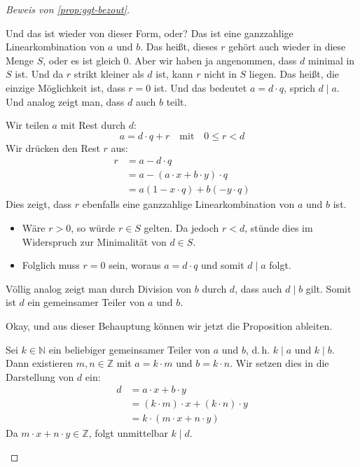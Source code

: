 \begin{proof}[Beweis von \cref{prop:ggt-bezout}]
\begin{spoken-clean}[00:18:28 - 00:22:20]
Und das ist wieder von dieser Form, oder? Das ist eine ganzzahlige Linearkombination von $a$ und $b$. Das heißt, dieses $r$ gehört auch wieder in diese Menge $S$, oder es ist gleich $0$. Aber wir haben ja angenommen, dass $d$ minimal in $S$ ist. Und da $r$ strikt kleiner als $d$ ist, kann $r$ nicht in $S$ liegen. Das heißt, die einzige Möglichkeit ist, dass $r = 0$ ist. Und das bedeutet $a = d \cdot q$, sprich $d \mid a$. Und analog zeigt man, dass $d$ auch $b$ teilt.
\end{spoken-clean}

\begin{math-stroke}
Wir teilen $a$ mit Rest durch $d$:
\[ a = d \cdot q + r \quad \text{mit} \quad 0 \le r < d \]
Wir drücken den Rest $r$ aus:
\begin{align*}
r &= a - d \cdot q \\
&= a - (a \cdot x + b \cdot y) \cdot q \\
&= a(1 - x \cdot q) + b(-y \cdot q)
\end{align*}
Dies zeigt, dass $r$ ebenfalls eine ganzzahlige Linearkombination von $a$ und $b$ ist.
\begin{itemize}
    \item Wäre $r > 0$, so würde $r \in S$ gelten. Da jedoch $r < d$, stünde dies im Widerspruch zur Minimalität von $d \in S$.
    \item Folglich muss $r = 0$ sein, woraus $a = d \cdot q$ und somit $d \mid a$ folgt.
\end{itemize}
Völlig analog zeigt man durch Division von $b$ durch $d$, dass auch $d \mid b$ gilt. Somit ist $d$ ein gemeinsamer Teiler von $a$ und $b$.
\end{math-stroke}

\begin{spoken-clean}[00:22:20 - 00:23:34]
Okay, und aus dieser Behauptung können wir jetzt die Proposition ableiten.
\end{spoken-clean}

\begin{math-stroke}
Sei $k \in \mathbb{N}$ ein beliebiger gemeinsamer Teiler von $a$ und $b$, d.\,h. $k \mid a$ und $k \mid b$.
Dann existieren $m, n \in \mathbb{Z}$ mit $a = k \cdot m$ und $b = k \cdot n$. Wir setzen dies in die Darstellung von $d$ ein:
\begin{align*}
d &= a \cdot x + b \cdot y \\
&= (k \cdot m) \cdot x + (k \cdot n) \cdot y \\
&= k \cdot (m \cdot x + n \cdot y)
\end{align*}
Da $m \cdot x + n \cdot y \in \mathbb{Z}$, folgt unmittelbar $k \mid d$.
\end{math-stroke}


\end{proof}
